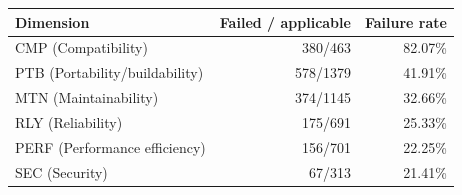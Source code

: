 \begin{tabular}{lrr}
\toprule
Dimension & Failed / applicable & Failure rate \\
\midrule
CMP (Compatibility) & 380/463 & 82.07\% \\
PTB (Portability/buildability) & 578/1379 & 41.91\% \\
MTN (Maintainability) & 374/1145 & 32.66\% \\
RLY (Reliability) & 175/691 & 25.33\% \\
PERF (Performance efficiency) & 156/701 & 22.25\% \\
SEC (Security) & 67/313 & 21.41\% \\
\bottomrule
\end{tabular}
